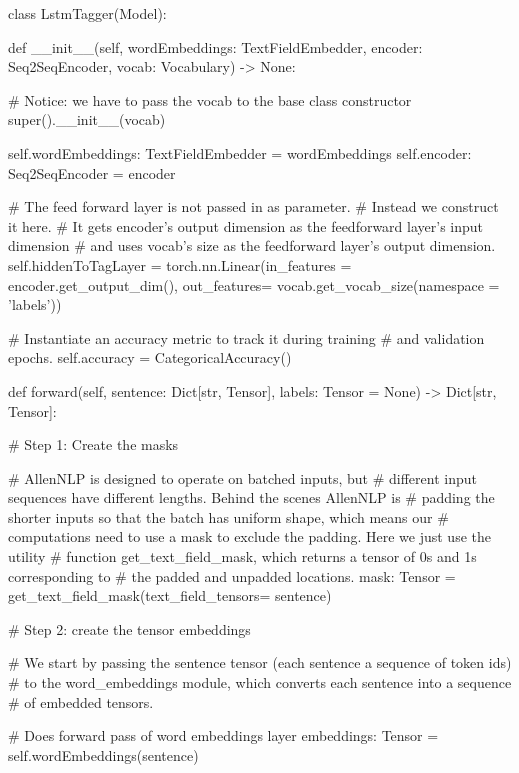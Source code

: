 \begin{pythonCode}

class LstmTagger(Model):

    def __init__(self,
                 wordEmbeddings: TextFieldEmbedder,
                 encoder: Seq2SeqEncoder,
                 vocab: Vocabulary) -> None:

        # Notice: we have to pass the vocab to the base class constructor
        super().__init__(vocab)

        self.wordEmbeddings: TextFieldEmbedder = wordEmbeddings
        self.encoder: Seq2SeqEncoder = encoder

        # The feed forward layer is not passed in as parameter.
        # Instead we construct it here.
        # It gets encoder's output dimension as the feedforward layer's input dimension
        # and uses vocab's size as the feedforward layer's output dimension.
        self.hiddenToTagLayer = torch.nn.Linear(in_features = encoder.get_output_dim(),
                                                out_features= vocab.get_vocab_size(namespace = 'labels'))

        # Instantiate an accuracy metric to track it during training
        # and validation epochs.
        self.accuracy = CategoricalAccuracy()



    def forward(self,
                sentence: Dict[str, Tensor],
                labels: Tensor = None) -> Dict[str, Tensor]:


        # Step 1: Create the masks

        # AllenNLP is designed to operate on batched inputs, but
        # different input sequences have different lengths. Behind the scenes AllenNLP is
        # padding the shorter inputs so that the batch has uniform shape, which means our
        # computations need to use a mask to exclude the padding. Here we just use the utility
        # function get_text_field_mask, which returns a tensor of 0s and 1s corresponding to
        # the padded and unpadded locations.
        mask: Tensor = get_text_field_mask(text_field_tensors= sentence)


        # Step 2: create the tensor embeddings

        # We start by passing the sentence tensor (each sentence a sequence of token ids)
        # to the word_embeddings module, which converts each sentence into a sequence
        # of embedded tensors.

        # Does forward pass of word embeddings layer
        embeddings: Tensor = self.wordEmbeddings(sentence)



\end{pythonCode}
